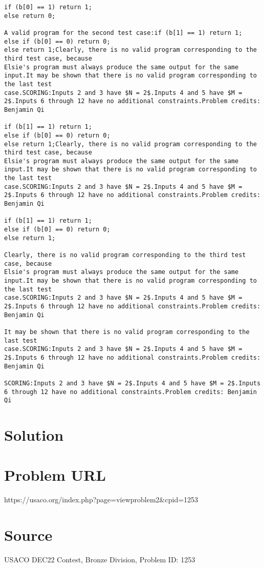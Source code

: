 \documentclass[12pt]{article}
\begin{document}
\begin{verbatim}
if (b[0] == 1) return 1;
else return 0;

A valid program for the second test case:if (b[1] == 1) return 1;
else if (b[0] == 0) return 0;
else return 1;Clearly, there is no valid program corresponding to the third test case, because
Elsie's program must always produce the same output for the same input.It may be shown that there is no valid program corresponding to the last test
case.SCORING:Inputs 2 and 3 have $N = 2$.Inputs 4 and 5 have $M = 2$.Inputs 6 through 12 have no additional constraints.Problem credits: Benjamin Qi

if (b[1] == 1) return 1;
else if (b[0] == 0) return 0;
else return 1;Clearly, there is no valid program corresponding to the third test case, because
Elsie's program must always produce the same output for the same input.It may be shown that there is no valid program corresponding to the last test
case.SCORING:Inputs 2 and 3 have $N = 2$.Inputs 4 and 5 have $M = 2$.Inputs 6 through 12 have no additional constraints.Problem credits: Benjamin Qi

if (b[1] == 1) return 1;
else if (b[0] == 0) return 0;
else return 1;

Clearly, there is no valid program corresponding to the third test case, because
Elsie's program must always produce the same output for the same input.It may be shown that there is no valid program corresponding to the last test
case.SCORING:Inputs 2 and 3 have $N = 2$.Inputs 4 and 5 have $M = 2$.Inputs 6 through 12 have no additional constraints.Problem credits: Benjamin Qi

It may be shown that there is no valid program corresponding to the last test
case.SCORING:Inputs 2 and 3 have $N = 2$.Inputs 4 and 5 have $M = 2$.Inputs 6 through 12 have no additional constraints.Problem credits: Benjamin Qi

SCORING:Inputs 2 and 3 have $N = 2$.Inputs 4 and 5 have $M = 2$.Inputs 6 through 12 have no additional constraints.Problem credits: Benjamin Qi
\end{verbatim}

\section*{Solution}


\section*{Problem URL}
https://usaco.org/index.php?page=viewproblem2&cpid=1253

\section*{Source}
USACO DEC22 Contest, Bronze Division, Problem ID: 1253
\end{document}
